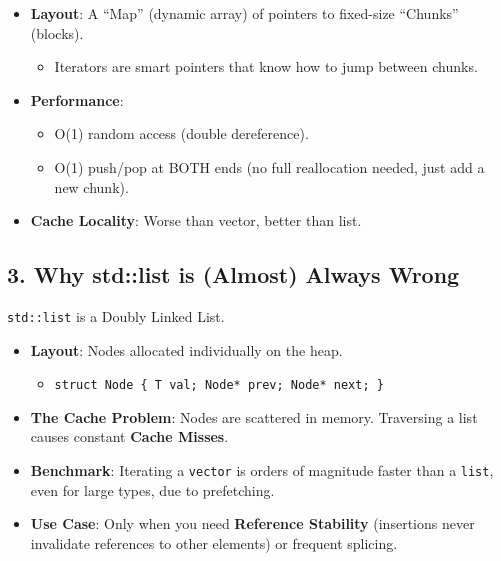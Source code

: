\begin{itemize}
\tightlist
\item
  \textbf{Layout}: A ``Map'' (dynamic array) of pointers to fixed-size
  ``Chunks'' (blocks).

  \begin{itemize}
  \tightlist
  \item
    Iterators are smart pointers that know how to jump between chunks.
  \end{itemize}
\item
  \textbf{Performance}:

  \begin{itemize}
  \tightlist
  \item
    O(1) random access (double dereference).
  \item
    O(1) push/pop at BOTH ends (no full reallocation needed, just add a
    new chunk).
  \end{itemize}
\item
  \textbf{Cache Locality}: Worse than vector, better than list.
\end{itemize}

\hypertarget{why-stdlist-is-almost-always-wrong}{%
\subsection{3. Why std::list is (Almost) Always
Wrong}\label{why-stdlist-is-almost-always-wrong}}

\passthrough{\lstinline!std::list!} is a Doubly Linked List.

\begin{itemize}
\tightlist
\item
  \textbf{Layout}: Nodes allocated individually on the heap.

  \begin{itemize}
  \tightlist
  \item
    \passthrough{\lstinline!struct Node \{ T val; Node* prev; Node* next; \}!}
  \end{itemize}
\item
  \textbf{The Cache Problem}: Nodes are scattered in memory. Traversing
  a list causes constant \textbf{Cache Misses}.
\item
  \textbf{Benchmark}: Iterating a \passthrough{\lstinline!vector!} is
  orders of magnitude faster than a \passthrough{\lstinline!list!}, even
  for large types, due to prefetching.
\item
  \textbf{Use Case}: Only when you need \textbf{Reference Stability}
  (insertions never invalidate references to other elements) or frequent
  splicing.
\end{itemize}

